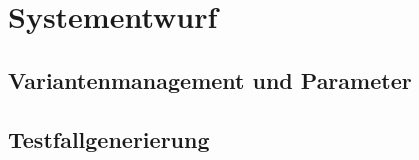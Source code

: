 \chapter{Systementwurf}\label{chp:systementwurf}


\section{Variantenmanagement und Parameter}
\paragraph{}


\section{Testfallgenerierung}
\paragraph{}
